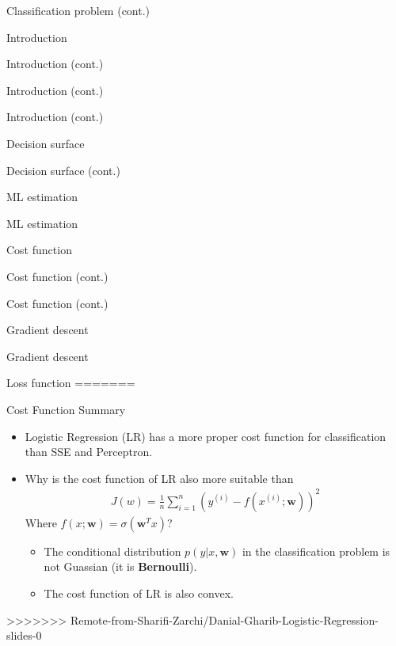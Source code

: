 \documentclass[serif, aspectratio=169]{beamer}
\begin{document}
\begin{frame}{Classification problem (cont.)}
\begin{itemize}
\begin{frame}{Introduction}
\begin{itemize}
\begin{frame}{Introduction (cont.)}
\begin{frame}{Introduction (cont.)}
\begin{frame}{Introduction (cont.)}
\begin{frame}{Decision surface}
\begin{itemize}
\begin{frame}{Decision surface (cont.)}
\begin{frame}{ML estimation}
\begin{frame}{ML estimation}
\begin{itemize}
\begin{frame}{Cost function}
\begin{frame}{Cost function (cont.)}
\begin{itemize}
\begin{itemize}
\begin{frame}{Cost function (cont.)}
\begin{frame}{Gradient descent}
\begin{frame}{Gradient descent}
\begin{frame}{Loss function}
=======
\begin{frame}{Cost Function Summary}
    \begin{itemize}
        \item Logistic Regression (LR) has a more proper cost function for classification than SSE and Perceptron.

        \item Why is the cost function of LR also more suitable than 
            \begin{align*}
                J(w) = \frac{1}{n}\sum_{i=1}^{n}(y^{(i)} - f(x^{(i)}; \mathbf{w}))^2
            \end{align*}
        Where $f(x; \mathbf{w}) = \sigma(\mathbf{w}^Tx)$?
            \begin{itemize}
                \item The conditional distribution $p(y|x, \mathbf{w})$ in the classification problem is not Guassian (it is \textbf{Bernoulli}).
                \item The cost function of LR is also convex.
            \end{itemize}
    \end{itemize}
\end{frame}
>>>>>>> Remote-from-Sharifi-Zarchi/Danial-Gharib-Logistic-Regression-slides-0



\end{frame}
\end{frame}
\end{frame}
\end{frame}
\end{itemize}
\end{itemize}
\end{frame}
\end{frame}
\end{itemize}
\end{frame}
\end{frame}
\end{frame}
\end{itemize}
\end{frame}
\end{frame}
\end{frame}
\end{frame}
\end{itemize}
\end{frame}
\end{itemize}
\end{frame}
\end{document}
